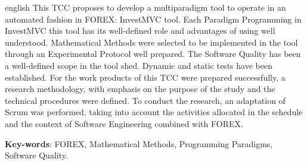 \begin{resumo}[Abstract]
 \begin{otherlanguage*}{english}
This TCC proposes to develop a multiparadigm tool to operate in an automated fashion in FOREX: InvestMVC tool. Each Paradigm Programming in InvestMVC this tool has its well-defined role and advantages of using well understood. Mathematical Methods were selected to be implemented in the tool through an Experimental Protocol well prepared. The Software Quality has been a well-defined scope in the tool shed. Dynamic and static tests have been established. For the work products of this TCC were prepared successfully, a research methodology, with emphasis on the purpose of the study and the technical procedures were defined. To conduct the research, an adaptation of Scrum was performed, taking into account the activities allocated in the schedule and the context of Software Engineering combined with FOREX.
   \vspace{\onelineskip}
 
   \noindent
   \textbf{Key-words}: FOREX, Mathematical Methods, Programming Paradigms, Software Quality.
 \end{otherlanguage*}
\end{resumo}
